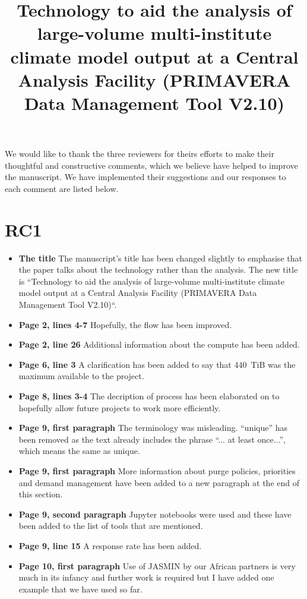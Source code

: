 \documentclass[12pt,a4paper]{article}
\begin{document}
\title{Technology to aid the analysis of large-volume multi-institute climate model output at a Central Analysis Facility (PRIMAVERA Data Management Tool V2.10)}
\maketitle
We would like to thank the three reviewers for theirs efforts to make their thoughtful and constructive comments, which we believe have helped to improve the manuscript. We have implemented their suggestions and our responses to each comment are listed below.

\section{RC1}
\begin{itemize}
\item \textbf{The title} The manuscript's title has been changed slightly to emphasise that the paper talks about the technology rather than the analysis. The new title is ``Technology to aid the analysis of large-volume multi-institute climate model output at a Central Analysis Facility (PRIMAVERA Data Management Tool V2.10)``.

\item \textbf{Page 2, lines 4-7} Hopefully, the flow has been improved.

\item \textbf{Page 2, line 26} Additional information about the compute has been added.

\item \textbf{Page 6, line 3} A clarification has been added to say that 440~TiB was the maximum available to the project.

\item \textbf{Page 8, lines 3-4} The decription of process has been elaborated on to hopefully allow future projects to work more efficiently. 

\item \textbf{Page 9, first paragraph} The terminology was misleading. ``unique'' has been removed as the text already includes the phrase ``... at least once...'', which means the same as unique. 

\item \textbf{Page 9, first paragraph} More information about purge policies, priorities and demand management have been added to a new paragraph at the end of this section.

\item \textbf{Page 9, second paragraph} Jupyter notebooks were used and these have been added to the list of tools that are mentioned.

\item \textbf{Page 9, line 15} A response rate has been added.

\item \textbf{Page 10, first paragraph}  Use of JASMIN by our African partners is very much in its infancy and further work is required but I have added one example that we have used so far.
\end{itemize}
\end{document}
